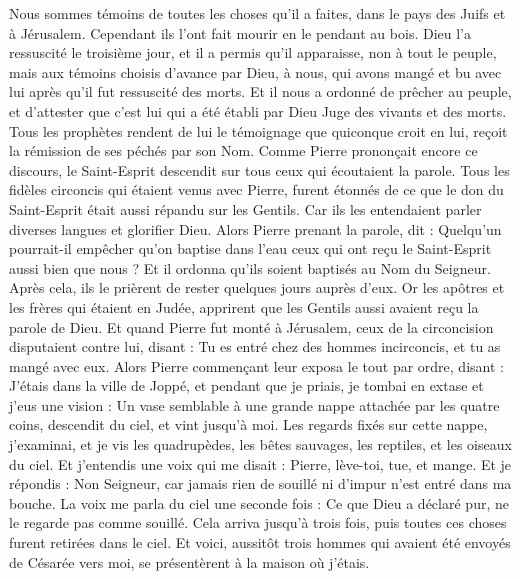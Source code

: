 \begin{multicols}{2}
Nous sommes témoins de toutes les choses qu'il a faites, dans le pays des Juifs et à Jérusalem. Cependant ils l'ont fait mourir en le pendant au bois.
Dieu l'a ressuscité le troisième jour, et il a permis qu'il apparaisse,
non à tout le peuple, mais aux témoins choisis d'avance par Dieu, à nous, qui avons mangé et bu avec lui après qu'il fut ressuscité des morts.
Et il nous a ordonné de prêcher au peuple, et d'attester que c'est lui qui a été établi par Dieu Juge des vivants et des morts.
Tous les prophètes rendent de lui le témoignage que quiconque croit en lui, reçoit la rémission de ses péchés par son Nom.
Comme Pierre prononçait encore ce discours, le Saint-Esprit descendit sur tous ceux qui écoutaient la parole.
Tous les fidèles circoncis qui étaient venus avec Pierre, furent étonnés de ce que le don du Saint-Esprit était aussi répandu sur les Gentils.
Car ils les entendaient parler diverses langues et glorifier Dieu.
Alors Pierre prenant la parole, dit : Quelqu'un pourrait-il empêcher qu'on baptise dans l'eau ceux qui ont reçu le Saint-Esprit aussi bien que nous ?
Et il ordonna qu'ils soient baptisés au Nom du Seigneur. Après cela, ils le prièrent de rester quelques jours auprès d'eux.
\VerseOne{}Or les apôtres et les frères qui étaient en Judée, apprirent que les Gentils aussi avaient reçu la parole de Dieu.
Et quand Pierre fut monté à Jérusalem, ceux de la circoncision disputaient contre lui,
disant : Tu es entré chez des hommes incirconcis, et tu as mangé avec eux.
Alors Pierre commençant leur exposa le tout par ordre, disant :
J'étais dans la ville de Joppé, et pendant que je priais, je tombai en extase et j'eus une vision : Un vase semblable à une grande nappe attachée par les quatre coins, descendit du ciel, et vint jusqu'à moi.
Les regards fixés sur cette nappe, j'examinai, et je vis les quadrupèdes, les bêtes sauvages, les reptiles, et les oiseaux du ciel.
Et j'entendis une voix qui me disait : Pierre, lève-toi, tue, et mange.
Et je répondis : Non Seigneur, car jamais rien de souillé ni d'impur n'est entré dans ma bouche.
La voix me parla du ciel une seconde fois : Ce que Dieu a déclaré pur, ne le regarde pas comme souillé.
Cela arriva jusqu'à trois fois, puis toutes ces choses furent retirées dans le ciel.
Et voici, aussitôt trois hommes qui avaient été envoyés de Césarée vers moi, se présentèrent à la maison où j'étais.

\end{multicols}
